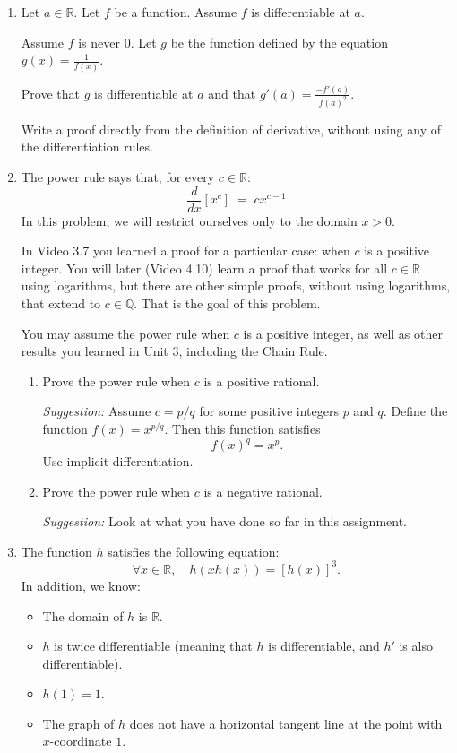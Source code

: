 \documentclass[12pt]{exam}
\newcommand {\DS} [1] {${\displaystyle #1}$}
\newcommand{\vv}{\vspace{.4cm}}
\newcommand{\R}{\mathbb{R}}
\newcommand{\Q}{\mathbb{Q}}
\begin{document}
\begin{enumerate}[resume]

\vv

\item  \label{qu:quotient} 
Let $a \in \R$.  Let $f$ be a function.  Assume $f$ is differentiable at $a$. 

Assume $f$ is never $0$.  Let $g$ be the function defined by the equation \DS{g(x) = \frac{1}{f(x)}}.

Prove that $g$ is differentiable at $a$ and that \DS{g'(a) =  \frac{-f'(a)}{f(a)^2}}. 

Write a proof directly from the definition of derivative, without using any of the differentiation rules.

\vv

\item \label{qu:power}  The power rule says that, for every $c \in \R$:
	$$
		\frac{d}{dx} \left[ x^c \right]  \; = \; c x^{c-1}
	$$
In this problem, we will restrict ourselves only to the domain $x>0$.

In Video 3.7 you learned a proof for a particular case: when $c$ is a positive integer.  You will later (Video 4.10) learn a proof that works for all $c \in \R$ using logarithms, but there are other simple proofs, without using logarithms, that extend to $c \in \Q$.  That is the goal of this problem.
	
You may assume the power rule when $c$ is a positive integer, as well as other results you learned in Unit 3, including the Chain Rule.
	\begin{enumerate}
		\item  Prove the power rule when $c$ is a positive rational.
		
		\emph{Suggestion:}  Assume $c=p/q$ for some positive integers $p$ and $q$.    Define the function $f(x)=x^{p/q}$.  Then this function satisfies
			$$
				f(x)^q = x^p.
			$$
			Use implicit differentiation.
		
		\item  Prove the power rule when $c$ is a negative rational.
		
		\emph{Suggestion:} Look at what you have done so far in this assignment.
	\end{enumerate}

\vv
\newpage

\item   The function $h$ satisfies the following equation:
	$$ \forall x \in \R, \quad h(xh(x)) = \left[ h(x)\right]^3. $$
In addition, we know:
	\begin{itemize}
		\item The domain of $h$ is $\R$.
		\item $h$ is twice differentiable (meaning that $h$ is differentiable, and $h'$ is also differentiable).
		\item $h(1)=1$.
		\item The graph of $h$ does not have a horizontal tangent line at the point with $x$-coordinate $1$.
	\end{itemize}
	

\end{enumerate}
\end{document}
